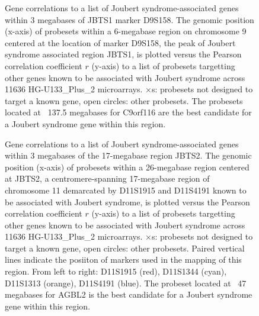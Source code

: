 \documentclass{bioinfo}
\begin{document}

\begin{figure}[!tpb]
\label{figure:JBTS1}
\centerline{}
\caption{Gene correlations to a list of Joubert syndrome-associated genes within 3
megabases of JBTS1 marker D9S158.  The genomic position (x-axis) of probesets
within a 6-megabase region on chromosome 9 centered at the location of marker D9S158, the peak
of Joubert syndrome associated region JBTS1, is plotted versus the Pearson
correlation coefficient $r$ (y-axis) to a list of probesets targetting other
genes known to be associated with Joubert syndrome across 11636
HG-U133\_Plus\_2 microarrays.  $\times$s: probesets not designed to target a
known gene, open circles: other probesets.  The probesets located at ~137.5
megabases for C9orf116 are the best candidate for a Joubert syndrome gene
within this region.}
\end{figure}


\begin{figure}[!tpb]
\label{figure:JBTS2}
\centerline{}
\caption{Gene correlations to a list of Joubert syndrome-associated genes within 3
megabases of the 17-megabase region JBTS2.  The genomic position (x-axis) of
probesets within a 26-megabase region centered at JBTS2, a centromere-spanning
17-megabase region of chromosome 11 demarcated by D11S1915 and D11S4191 known
to be associated with Joubert syndrome, is plotted versus the Pearson
correlation coefficient $r$ (y-axis) to a list of probesets targetting other
genes known to be associated with Joubert syndrome across 11636
HG-U133\_Plus\_2 microarrays.  $\times$s: probesets not designed to target a
known gene, open circles: other probesets.  Paired vertical lines indicate the
posiiton of markers used in the mapping of this region.  From left to right:
D11S1915 (red), D11S1344 (cyan), D11S1313 (orange), D11S4191 (blue).  The
probeset located at ~47 megabases for AGBL2 is the best candidate for a Joubert
syndrome gene within this region.}
\end{figure}
\end{document}
